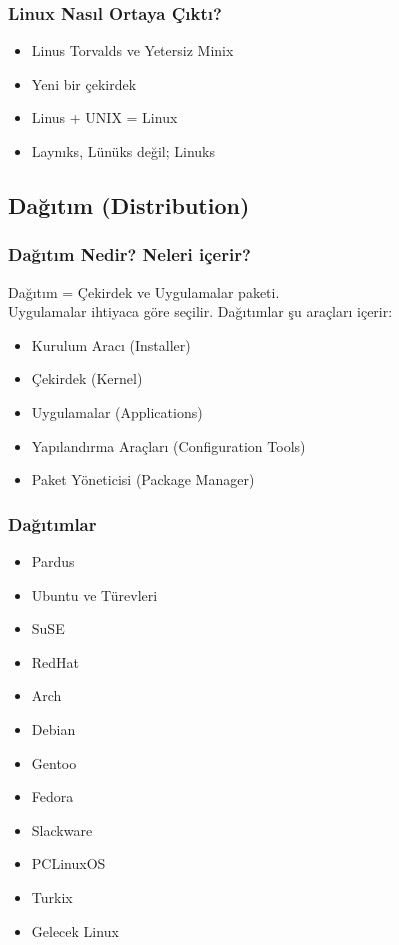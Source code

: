 \documentclass{beamer}
\begin{document}
		\begin{frame}
			\frametitle{Linux Nasıl Ortaya Çıktı?}
				\begin{itemize}
					\item Linus Torvalds ve Yetersiz Minix
					\item Yeni bir çekirdek
					\item Linus + UNIX = Linux
					\item Laynıks, Lünüks değil; Linuks
				\end{itemize}  



		\end{frame}
	
	\subsection{Dağıtım (Distribution)}
		\begin{frame}
		 	\frametitle{Dağıtım Nedir? Neleri içerir?}
			Dağıtım = Çekirdek ve Uygulamalar paketi.\\ Uygulamalar ihtiyaca göre seçilir. Dağıtımlar şu araçları içerir:\\
			\begin{itemize}
			 \item Kurulum Aracı (Installer)
			 \item Çekirdek (Kernel)
			 \item Uygulamalar (Applications)
			 \item Yapılandırma Araçları (Configuration Tools)
			 \item Paket Yöneticisi (Package Manager)
			\end{itemize}

		\end{frame}
		
		\begin{frame}
		 	\frametitle{Dağıtımlar}
			\begin{itemize}
			 \item Pardus
			 \item Ubuntu ve Türevleri
			 \item SuSE
			 \item RedHat
			 \item Arch
			 \item Debian
			 \item Gentoo
			 \item Fedora
			 \item Slackware
			 \item PCLinuxOS
			 \item Turkix
			 \item Gelecek Linux
			\end{itemize}
		\end{frame}
\end{document}
